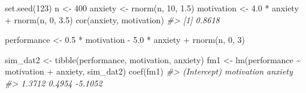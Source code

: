 \documentclass[
  11pt,
]{krantz}
\makeatletter
\newenvironment{Shaded}{\begin{snugshade}}{\end{snugshade}}
\newcommand{\CommentTok}[1]{\textcolor[rgb]{0.37,0.37,0.37}{\textit{#1}}}
\newcommand{\DecValTok}[1]{\textcolor[rgb]{0.06,0.06,0.06}{#1}}
\newcommand{\FloatTok}[1]{\textcolor[rgb]{0.06,0.06,0.06}{#1}}
\newcommand{\FunctionTok}[1]{\textcolor[rgb]{0,0,0}{#1}}
\newcommand{\NormalTok}[1]{#1}
\newcommand{\OtherTok}[1]{\textcolor[rgb]{0.37,0.37,0.37}{#1}}
\newcommand{\SpecialCharTok}[1]{\textcolor[rgb]{0,0,0}{#1}}
\newenvironment{kframe}{%
\medskip{}
\setlength{\fboxsep}{.8em}
 \def\at@end@of@kframe{}%
 \ifinner\ifhmode%
  \def\at@end@of@kframe{\end{minipage}}%
  \begin{minipage}{\columnwidth}%
 \fi\fi%
 \def\FrameCommand##1{\hskip\@totalleftmargin \hskip-\fboxsep
 \colorbox{shadecolor}{##1}\hskip-\fboxsep
     \hskip-\linewidth \hskip-\@totalleftmargin \hskip\columnwidth}%
 \MakeFramed {\advance\hsize-\width
   \@totalleftmargin\z@ \linewidth\hsize
   \@setminipage}}%
 {\par\unskip\endMakeFramed%
 \at@end@of@kframe}
\renewenvironment{Shaded}{\begin{kframe}}{\end{kframe}}
\makeatother
\begin{document}
\begin{Shaded}
\begin{Highlighting}[]
\FunctionTok{set.seed}\NormalTok{(}\DecValTok{123}\NormalTok{)}
\NormalTok{n }\OtherTok{\textless{}{-}} \DecValTok{400}
\NormalTok{anxiety }\OtherTok{\textless{}{-}} \FunctionTok{rnorm}\NormalTok{(n, }\DecValTok{10}\NormalTok{, }\FloatTok{1.5}\NormalTok{)}
\NormalTok{motivation }\OtherTok{\textless{}{-}} \FloatTok{4.0} \SpecialCharTok{*}\NormalTok{ anxiety }\SpecialCharTok{+} \FunctionTok{rnorm}\NormalTok{(n, }\DecValTok{0}\NormalTok{, }\FloatTok{3.5}\NormalTok{)}
\FunctionTok{cor}\NormalTok{(anxiety, motivation)}
\CommentTok{\#\textgreater{} [1] 0.8618}
\end{Highlighting}
\end{Shaded}

\begin{Shaded}
\begin{Highlighting}[]
\NormalTok{performance }\OtherTok{\textless{}{-}} \FloatTok{0.5} \SpecialCharTok{*}\NormalTok{ motivation }\SpecialCharTok{{-}} \FloatTok{5.0} \SpecialCharTok{*}\NormalTok{ anxiety }\SpecialCharTok{+} \FunctionTok{rnorm}\NormalTok{(n, }\DecValTok{0}\NormalTok{, }\DecValTok{3}\NormalTok{)}
\end{Highlighting}
\end{Shaded}

\begin{Shaded}
\begin{Highlighting}[]
\NormalTok{sim\_dat2 }\OtherTok{\textless{}{-}} \FunctionTok{tibble}\NormalTok{(performance, motivation, anxiety)}
\NormalTok{fm1 }\OtherTok{\textless{}{-}} \FunctionTok{lm}\NormalTok{(performance }\SpecialCharTok{\textasciitilde{}}\NormalTok{ motivation }\SpecialCharTok{+}\NormalTok{ anxiety, sim\_dat2)}
\FunctionTok{coef}\NormalTok{(fm1)}
\CommentTok{\#\textgreater{} (Intercept)  motivation     anxiety }
\CommentTok{\#\textgreater{}      1.3712      0.4954     {-}5.1052}
\end{Highlighting}
\end{Shaded}
\end{document}
